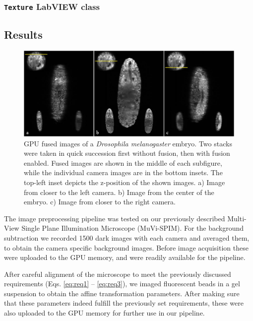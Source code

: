   \subsubsection{\texttt{Texture} LabVIEW class}

\subsection{Results}

  \begin{figure}[tb]
    \centering
    \includegraphics[width=1\textwidth]{fusion/drosophila_D2}
    \caption{ GPU fused images of a \textit{Drosophila melanogaster} embryo. Two stacks were taken in quick succession first without fusion, then with fusion enabled. Fused images are shown in the middle of each subfigure, while the individual camera images are in the bottom insets. The top-left inset depicts the z-position of the shown images. a) Image from closer to the left camera. b) Image from the center of the embryo. c) Image from closer to the right camera.}
    \label{fig:drosophila}
  \end{figure}

  The image preprocessing pipeline was tested on our previously described Multi-View Single Plane Illumination Microscope (MuVi-SPIM)\cite{krzic_multiview_2012}. For the background subtraction we recorded 1500 dark images with each camera and averaged them, to obtain the camera specific background images. Before image acquisition these were uploaded to the GPU memory, and were readily available for the pipeline.

  After careful alignment of the microscope to meet the previously discussed requirements (Eqs. \eqref{eq:req1} -- \eqref{eq:req3}), we imaged fluorescent beads in a gel suspension to obtain the affine transformation parameters. After making sure that these parameters indeed fulfill the previously set requirements, these were also uploaded to the GPU memory for further use in our pipeline.

